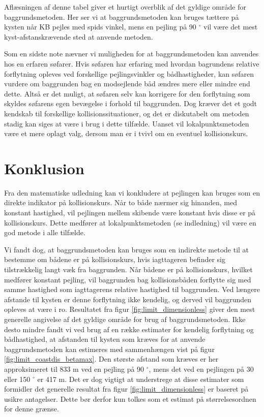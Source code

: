 \documentclass[%
 reprint,
nofootinbib,
aps,
]{revtex4-1}
\begin{document}
Aflæsningen af denne tabel giver et hurtigt overblik af det gyldige område for baggrundsmetoden. Her ser vi at baggrundsmetoden kan bruges tættere på kysten når KB pejles med spids vinkel, mens en pejling på 90 $^{\circ}$ vil være det mest kyst-afstanskrævende sted at anvende metoden. \par
Som en sidste note nævner vi muligheden for at baggrundsmetoden kan anvendes hos en erfaren søfarer. Hvis søfaren har erfaring med hvordan bagrundens relative forflytning opleves ved forskellige pejlingsvinkler og bådhastigheder, kan søfaren vurdere om baggrunden bag en modsejlende båd ændres mere eller mindre end dette. Altså er det muligt, at søfaren selv kan korrigere for den forflytning som skyldes søfarens egen bevægelse i forhold til baggrunden. Dog kræver det et godt kendskab til forskellige kollisionssituationer, og det er diskutabelt om metoden stadig kan siges at være i brug i dette tilfælde. Uanset vil lokalpunktsmetoden være et mere oplagt valg, dersom man er i tvivl om en eventuel kollisionskurs.
\linebreak


\newpage

\section{Konklusion}
Fra den matematiske udledning kan vi konkludere at pejlingen kan bruges som en direkte indikator på kollisionskurs. Når to både nærmer sig hinanden, med konstant hastighed, vil pejlingen mellem skibende være konstant hvis disse er på kollisionskurs. Dette medfører at lokalpunktsmetoden (se indledning) vil være en god metode i alle tilfælde. \par
Vi fandt dog, at baggrundsmetoden kan bruges som en indirekte metode til at bestemme om bådene er på kollisionskurs, hvis iagttageren befinder sig tilstrækkelig langt væk fra baggrunden. Når bådene er på kollisionskurs, hvilket medfører konstant pejling, vil baggrunden bag kollisionsbåden forflytte sig med samme hastighed som iagttagerens relative hastighed til baggrunden. Ved længere afstande til kysten er denne forflytning ikke kendelig, og derved vil baggrunden opleves at være i ro. Resultatet fra figur \ref{fig:limit_dimensionless} giver den mest generelle angivelse af det gyldige område for brug af baggrundsmetoden. Ikke desto mindre fandt vi ved brug af en række estimater for kendelig forflytning og bådhastighed, at afstanden til kysten som kræves for at anvende baggrundsmetoden kan estimeres med sammenhængen vist på figur \ref{fig:limit_coastdis_betamax}. Den største afstand som kræves er her approksimeret til 833 m ved en pejling på 90 $^{\circ}$, mens det ved en pejlingen på 30 eller 150 $^{\circ}$ er 417 m. Det er dog vigtigt at understrege at disse estimater som formidler det generelle resultat fra figur \ref{fig:limit_dimensionless} er baseret på usikre antagelser. Dette bør derfor kun tolkes som et estimat på størrelsesordnen for denne grænse.
\end{document}

